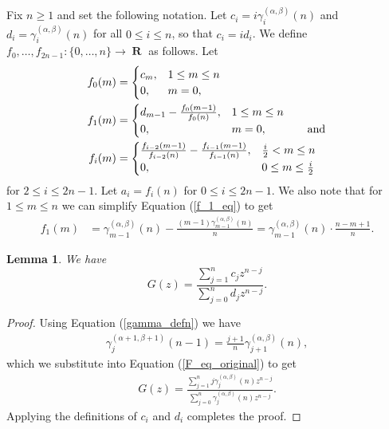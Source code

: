 \documentclass{amsart}
\newcommand{\R}{\operatorname{\mathbf{R}}}
\theoremstyle{plain}
\newtheorem{lem}[equation]{Lemma}
\theoremstyle{remark}
\begin{document}
Fix $n \geq 1$ and set the following notation. Let $c_i=i\gamma_i^{(\alpha,\beta)}(n)$ and $d_i=\gamma_i^{(\alpha,\beta)}(n)$ for all $0\le i\le n$, so that $c_i = id_i$. We define $f_0,\ldots,f_{2n-1}:\{0,\dots,n\} \to \R$ as follows. Let 
\begin{align}
f_0(m)&=\begin{cases} c_m,&1\le m\le n\\
0,&m=0, \end{cases} \label{f_0_eq}
\\
f_1(m)&=\begin{cases} d_{m-1}-\frac{f_0(m-1)}{f_0(n)},&1\le m\le n\\
0,&m=0,\hspace{0.5in}\text{and} \end{cases} \label{f_1_eq}
\\
f_i(m)&=\begin{cases}
\frac{f_{i-2}(m-1)}{f_{i-2}(n)}-\frac{f_{i-1}(m-1)}{f_{i-1}(n)},&\frac{i}{2}< m\le n\\
0,&0\le m\le\frac{i}{2}
\end{cases} \label{f_i_eq} \end{align}
for $2\le i\le 2n-1$. Let $a_i=f_i(n)$ for  $0\le i\le 2n-1$. We also note that for  $1\le m\le n$ we can simplify Equation (\ref{f_1_eq}) to get
\begin{align} \label{f_1_simplified}
    f_1(m)&=\gamma_{m-1}^{(\alpha,\beta)}(n)-\frac{(m-1)\gamma_{m-1}^{(\alpha,\beta)}(n)}{n} =\gamma_{m-1}^{(\alpha,\beta)}(n)\cdot\frac{n-m+1}{n}.
\end{align}

\begin{lem} \label{F_eq_cd}
We have \[G(z)=\frac{\sum_{j=1}^{n}c_jz^{n-j}}{\sum_{j=0}^nd_jz^{n-j}}.\]
\end{lem}

\begin{proof}
Using Equation (\ref{gamma_defn}) we have
\begin{align*}
    \gamma_j^{(\alpha+1,\beta+1)}(n-1)=\frac{j+1}{n}\gamma_{j+1}^{(\alpha,\beta)}(n),
\end{align*}
which we substitute into Equation (\ref{F_eq_original}) to get
\begin{align*}
    G(z)=\frac{\sum_{j=1}^{n}j\gamma_j^{(\alpha,\beta)}(n)z^{n-j}}{\sum_{j=0}^n\gamma_j^{(\alpha,\beta)}(n)z^{n-j}}.
\end{align*}
Applying the definitions of $c_i$ and $d_i$ completes the proof.
\end{proof}
\end{document}
